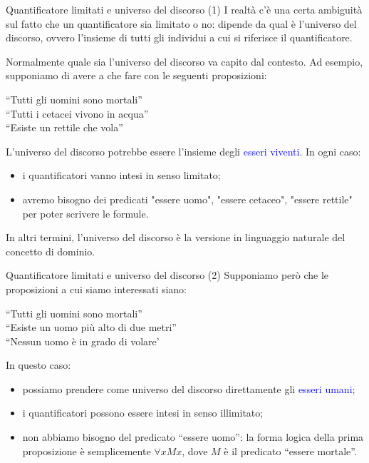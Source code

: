 \documentclass[aspectratio=169,10pt,dvipsnames,xcolor=table,handout]{beamer}
\begin{document}
\begin{frame}{Quantificatore limitati e universo del discorso (1)}
    I realtà c'è una certa ambiguità sul fatto che un quantificatore sia limitato o no: dipende da qual è l'\alert{universo del discorso}, ovvero l'insieme di tutti gli individui a cui si riferisce il quantificatore.

    \medskip
    Normalmente quale sia l'universo del discorso va capito dal contesto. Ad esempio, supponiamo di avere a che fare con le seguenti proposizioni:
    \begin{center}
        ``Tutti gli uomini sono mortali''\\
        ``Tutti i cetacei vivono in acqua''\\
        ``Esiste un rettile che vola''
    \end{center}
    L'universo del discorso potrebbe essere l'insieme degli \textcolor{blue}{esseri viventi}. In ogni caso:
    \begin{itemize}
        \item i quantificatori vanno intesi in senso limitato;
        \item avremo bisogno dei predicati "essere uomo", "essere cetaceo", "essere rettile" per poter scrivere le formule.
    \end{itemize}
    \medskip
    In altri termini, l'universo del discorso è la versione in linguaggio naturale del concetto di dominio.
\end{frame}

\begin{frame}{Quantificatore limitati e universo del discorso (2)}
    Supponiamo però che le proposizioni a cui siamo interessati siano:
    \begin{center}
        ``Tutti gli uomini sono mortali''\\
        ``Esiste un uomo più alto di due metri''\\
        ``Nessun uomo è in grado di volare'
    \end{center}
    In questo caso:
    \begin{itemize}
        \item possiamo prendere come universo del discorso direttamente gli \textcolor{blue}{esseri umani};
        \item i quantificatori possono essere intesi in senso illimitato;
        \item non abbiamo bisogno del predicato ``essere uomo'': la forma logica della prima proposizione è semplicemente $\forall x Mx$, dove $M$ è il predicato ``essere mortale''.
    \end{itemize}
\end{frame}
\end{document}
